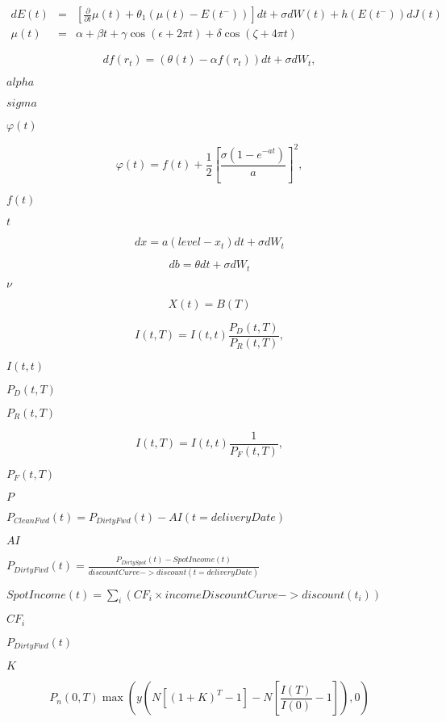\documentclass{article}
\begin{document}
\[\begin{array}{rcl}
    dE(t) &=& \left[ \frac{\partial}{\partial t} \mu(t)
        +\theta_1 \left(\mu(t)-E(t^-)\right)\right]dt
        +\sigma dW(t) + h(E(t^-))dJ(t) \\
    \mu(t)&=& \alpha + \beta t +\gamma \cos(\epsilon+2\pi t)
        +\delta \cos(\zeta + 4\pi t)
\end{array}
\]
\pagebreak

\[d f(r_t) = (\theta(t) - \alpha f(r_t))dt + \sigma dW_t,
\]
\pagebreak

$ alpha $
\pagebreak

$ sigma $
\pagebreak

$ \varphi(t) $
\pagebreak

\[    \varphi(t) = f(t) + \frac{1}{2}[\frac{\sigma(1-e^{-at})}{a}]^2,
\]
\pagebreak

$ f(t) $
\pagebreak

$ t $
\pagebreak

\[    dx = a (level - x_t) dt + \sigma dW_t
\]
\pagebreak

\[    db = \theta dt + \sigma dW_t
\]
\pagebreak

$ \nu
$
\pagebreak

\[    X(t) = B(T)
\]
\pagebreak

\[I(t, T) = I(t, t) \frac{P_{D}(t, T)}{P_{R}(t, T)},
\]
\pagebreak

$ I(t, t) $
\pagebreak

$ P_{D}(t, T) $
\pagebreak

$ P_{R}(t, T) $
\pagebreak

\[I(t, T) = I(t, t) \frac{1}{P_{F}(t, T)},
\]
\pagebreak

$ P_{F}(t, T) $
\pagebreak

$P$
\pagebreak

$ P_{CleanFwd}(t) = P_{DirtyFwd}(t) -
      AI(t=deliveryDate) $
\pagebreak

$ AI $
\pagebreak

$ P_{DirtyFwd}(t) = \frac{P_{DirtySpot}(t) -
      SpotIncome(t)} {discountCurve->discount(t=deliveryDate)} $
\pagebreak

$ SpotIncome(t) = \sum_i \left( CF_i \times
      incomeDiscountCurve->discount(t_i) \right) $
\pagebreak

$      CF_i $
\pagebreak

$ P_{DirtyFwd}(t) $
\pagebreak

$ K $
\pagebreak

\[P_n(0,T) \max(y (N [(1+K)^{T}-1] -
            N \left[ \frac{I(T)}{I(0)} -1 \right]), 0)
\]
\pagebreak
\end{document}
